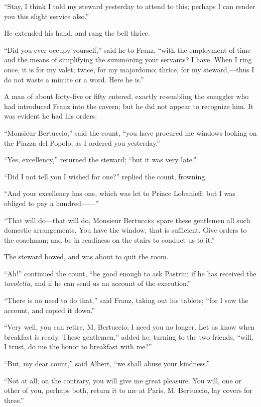 “Stay, I think I told my steward yesterday to attend to this; perhaps I
can render you this slight service also.”

He extended his hand, and rang the bell thrice.

“Did you ever occupy yourself,” said he to Franz, “with the employment
of time and the means of simplifying the summoning your servants? I
have. When I ring once, it is for my valet; twice, for my majordomo;
thrice, for my steward,—thus I do not waste a minute or a word. Here he
is.”

A man of about forty-five or fifty entered, exactly resembling the
smuggler who had introduced Franz into the cavern; but he did not
appear to recognize him. It was evident he had his orders.

“Monsieur Bertuccio,” said the count, “you have procured me windows
looking on the Piazza del Popolo, as I ordered you yesterday.”

“Yes, excellency,” returned the steward; “but it was very late.”

“Did I not tell you I wished for one?” replied the count, frowning.

“And your excellency has one, which was let to Prince Lobanieff; but I
was obliged to pay a hundred——”

“That will do—that will do, Monsieur Bertuccio; spare these gentlemen
all such domestic arrangements. You have the window, that is
sufficient. Give orders to the coachman; and be in readiness on the
stairs to conduct us to it.”

The steward bowed, and was about to quit the room.

“Ah!” continued the count, “be good enough to ask Pastrini if he has
received the \textit{tavoletta}, and if he can send us an account of the
execution.”

“There is no need to do that,” said Franz, taking out his tablets; “for
I saw the account, and copied it down.”

“Very well, you can retire, M. Bertuccio; I need you no longer. Let us
know when breakfast is ready. These gentlemen,” added he, turning to
the two friends, “will, I trust, do me the honor to breakfast with me?”

“But, my dear count,” said Albert, “we shall abuse your kindness.”

“Not at all; on the contrary, you will give me great pleasure. You
will, one or other of you, perhaps both, return it to me at Paris. M.
Bertuccio, lay covers for three.”

